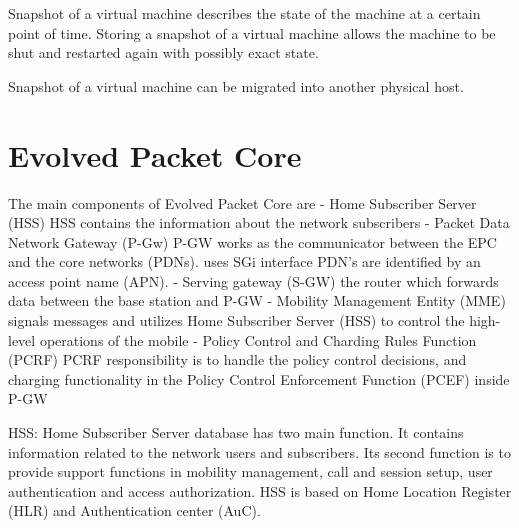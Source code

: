 Snapshot of a virtual machine describes the state of the machine at a certain point of time. Storing a snapshot of a virtual machine allows the machine to be shut and restarted again with possibly exact state.

Snapshot of a virtual machine can be migrated into another physical host.

\section{Evolved Packet Core}
\label{section:evolved-packet-core}

The main components of Evolved Packet Core are
  - Home Subscriber Server (HSS)
    HSS contains the information about the network subscribers
  - Packet Data Network Gateway (P-Gw)
    P-GW works as the communicator between the EPC and the core networks (PDNs).
    uses SGi interface
    PDN's are identified by an access point name (APN).
  - Serving gateway (S-GW)
    the router which forwards data between the base station and P-GW
  - Mobility Management Entity (MME)
    signals messages and utilizes Home Subscriber Server (HSS) to control the high-level operations of the mobile
  - Policy Control and Charding Rules Function (PCRF)
    PCRF responsibility is to handle the policy control decisions, and charging functionality in the Policy Control Enforcement Function (PCEF) inside P-GW


HSS:
Home Subscriber Server database has two main function. It contains information related to the network users and subscribers. Its second function is to provide support functions in mobility management, call and session setup, user authentication and access authorization. HSS is based on Home Location Register (HLR) and Authentication center (AuC).


